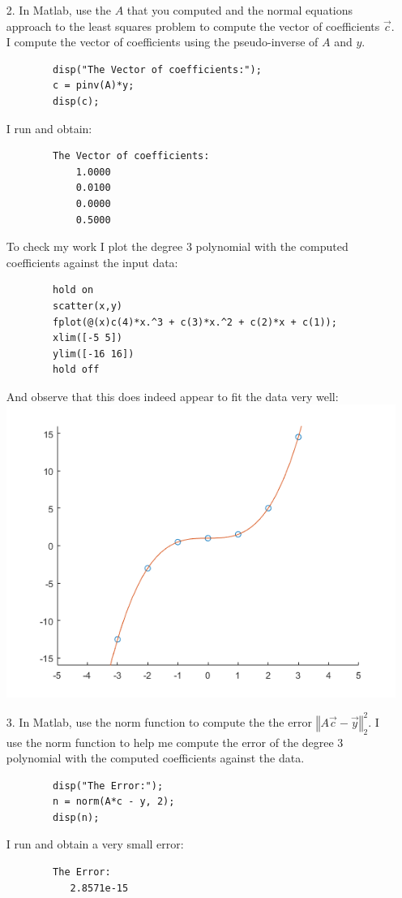 \documentclass{article}
\begin{document}
\begin{itemize}
    \newpage
    \item[2.] In Matlab, use the $A$ that you computed and the normal equations approach to the least squares problem to compute the vector of coefficients $\overrightarrow{c}$.
    \newline\newline
    I compute the vector of coefficients using the pseudo-inverse of $A$ and $y$.
    \begin{verbatim}
        disp("The Vector of coefficients:");
        c = pinv(A)*y;
        disp(c);
    \end{verbatim}
     I run and obtain:
    \begin{verbatim}
        The Vector of coefficients:
            1.0000
            0.0100
            0.0000
            0.5000
    \end{verbatim}
    To check my work I plot the degree 3 polynomial with the computed coefficients against the input data:
    \begin{verbatim}
        hold on
        scatter(x,y)
        fplot(@(x)c(4)*x.^3 + c(3)*x.^2 + c(2)*x + c(1));
        xlim([-5 5])
        ylim([-16 16])
        hold off
    \end{verbatim}
    And observe that this does indeed appear to fit the data very well:
    \newline\newline
    \includegraphics[scale=0.5]{Homework4/422.png}
    
    \newpage
    \item[3.] In Matlab, use the norm function to compute the the error $\left\Vert A\overrightarrow{c}-\overrightarrow{y}\right\Vert^2_2$.
    \newline\newline
    I use the norm function to help me compute the error of the degree 3 polynomial with the computed coefficients against the data. 
    \begin{verbatim}
        disp("The Error:");
        n = norm(A*c - y, 2);
        disp(n);
    \end{verbatim}
     I run and obtain a very small error:
    \begin{verbatim}
        The Error:
           2.8571e-15
    \end{verbatim}
\end{itemize}
\end{document}
